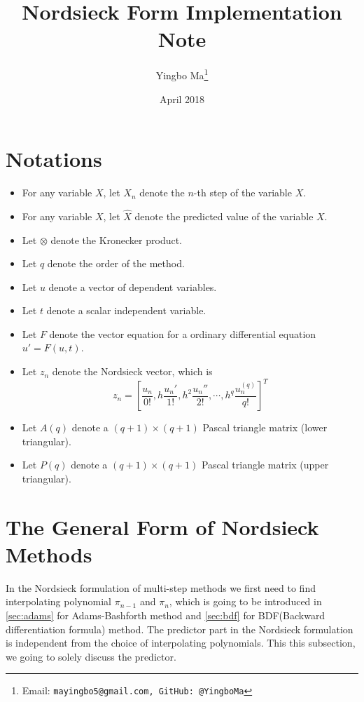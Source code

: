 \documentclass[11pt,a4paper]{article}
\title{Nordsieck Form Implementation Note}
\author{Yingbo Ma\thanks{Email: \tt{mayingbo5@gmail.com},
                         GitHub: \tt{@YingboMa}}}
\date{April 2018}
\begin{document}
\maketitle

\section*{Notations}
\begin{multicols}{2}
  \begin{itemize}
    \item For any variable $X$, let $X_n$ denote the $n$-th step of the variable $X$.
    \item For any variable $X$, let $\hat{X}$ denote the predicted value of the variable $X$.
    \item Let $\otimes$ denote the Kronecker product.
    \item Let $q$ denote the order of the method.
    \item Let $u$ denote a vector of dependent variables.
    \item Let $t$ denote a scalar independent variable.
    \columnbreak
    \item Let $F$ denote the vector equation for a ordinary differential equation
      $u' = F(u, t)$.
    \item Let $z_n$ denote the Nordsieck vector, which is
      \[
        z_n = \left[\frac{u_n}{0!}, h\frac{u_n'}{1!}, h^2\frac{u_n''}{2!},
        \cdots, h^q\frac{u_n^{(q)}}{q!}\right]^T
      \]
    \item Let $A(q)$ denote a $(q+1)\times (q+1)$ Pascal triangle matrix (lower
      triangular).
    \item Let $P(q)$ denote a $(q+1)\times (q+1)$ Pascal triangle matrix (upper
      triangular).
  \end{itemize}
\end{multicols}

\section{The General Form of Nordsieck Methods}
In the Nordsieck formulation of multi-step methods we first need to find
interpolating polynomial $\pi_{n-1}$ and $\pi_n$, which is going to be
introduced in \cref{sec:adams} for Adams-Bashforth method and
\cref{sec:bdf} for BDF(Backward differentiation formula) method. The
predictor part in the Nordsieck formulation is independent from the choice of
interpolating polynomials. This this subsection, we going to solely discuss the
predictor.
\end{document}
